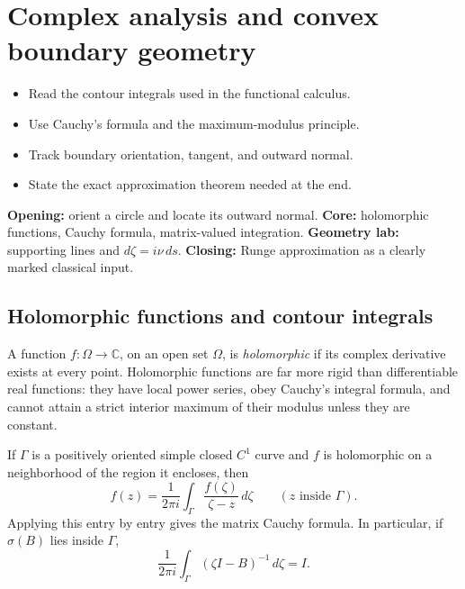 \documentclass[11pt,oneside,openany]{book}
\theoremstyle{definition}
\theoremstyle{remark}
\newcommand{\C}{\mathbb C}
\newcommand{\spec}{\sigma}
\begin{document}
\chapter{Complex analysis and convex boundary geometry}
\label{ch:complex-convex}

\begin{learninggoals}
\begin{itemize}
  \item Read the contour integrals used in the functional calculus.
  \item Use Cauchy's formula and the maximum-modulus principle.
  \item Track boundary orientation, tangent, and outward normal.
  \item State the exact approximation theorem needed at the end.
\end{itemize}
\end{learninggoals}

\begin{workshopplan}
\textbf{Opening:} orient a circle and locate its outward normal.
\textbf{Core:} holomorphic functions, Cauchy formula, matrix-valued
integration. \textbf{Geometry lab:} supporting lines and
\(d\zeta=i\nu\,ds\). \textbf{Closing:} Runge approximation as a
clearly marked classical input.
\end{workshopplan}

\section{Holomorphic functions and contour integrals}

A function \(f:\Omega\to\C\), on an open set \(\Omega\), is
\emph{holomorphic} if its complex derivative exists at every point.
Holomorphic functions are far more rigid than differentiable real
functions: they have local power series, obey Cauchy's integral
formula, and cannot attain a strict interior maximum of their modulus
unless they are constant.

If \(\Gamma\) is a positively oriented simple closed \(C^1\) curve and
\(f\) is holomorphic on a neighborhood of the region it encloses, then
\begin{equation}
  f(z)=\frac{1}{2\pi i}\int_\Gamma
  \frac{f(\zeta)}{\zeta-z}\,d\zeta
  \qquad(z\text{ inside }\Gamma).
  \label{eq:scalar-cauchy}
\end{equation}
Applying this entry by entry gives the matrix Cauchy formula.  In
particular, if \(\spec(B)\) lies inside \(\Gamma\),
\begin{equation}
  \frac{1}{2\pi i}\int_\Gamma
  (\zeta I-B)^{-1}\,d\zeta=I.
  \label{eq:matrix-resolvent-mass}
\end{equation}
\end{document}
